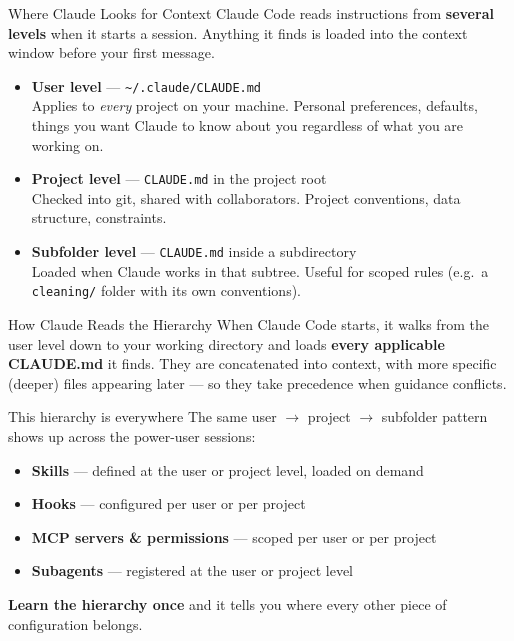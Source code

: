 \documentclass[aspectratio=169, 11pt]{beamer}
\begin{document}
\begin{frame}{Where Claude Looks for Context}
  Claude Code reads instructions from \textbf{several levels} when it starts a session. Anything it finds is loaded into the context window before your first message.

  \vspace{0.6em}
  \begin{itemize}
    \item \textbf{User level} --- \texttt{\textasciitilde/.claude/CLAUDE.md}\\
      {\small Applies to \textit{every} project on your machine. Personal preferences, defaults, things you want Claude to know about you regardless of what you are working on.}
    \item \textbf{Project level} --- \texttt{CLAUDE.md} in the project root\\
      {\small Checked into git, shared with collaborators. Project conventions, data structure, constraints.}
    \item \textbf{Subfolder level} --- \texttt{CLAUDE.md} inside a subdirectory\\
      {\small Loaded when Claude works in that subtree. Useful for scoped rules (e.g.\ a \texttt{cleaning/} folder with its own conventions).}
  \end{itemize}

\end{frame}

\begin{frame}{How Claude Reads the Hierarchy}
  When Claude Code starts, it walks from the user level down to your working directory and loads \textbf{every applicable CLAUDE.md} it finds. They are concatenated into context, with more specific (deeper) files appearing later --- so they take precedence when guidance conflicts.

  \vspace{0.8em}
  \begin{alertblock}{This hierarchy is everywhere}
    The same user $\rightarrow$ project $\rightarrow$ subfolder pattern shows up across the power-user sessions:
    \begin{itemize}
      \item \textbf{Skills} --- defined at the user or project level, loaded on demand
      \item \textbf{Hooks} --- configured per user or per project
      \item \textbf{MCP servers \& permissions} --- scoped per user or per project
      \item \textbf{Subagents} --- registered at the user or project level
    \end{itemize}
  \end{alertblock}

  \vspace{0.4em}
  \textbf{Learn the hierarchy once} and it tells you where every other piece of configuration belongs.
\end{frame}
\end{document}
